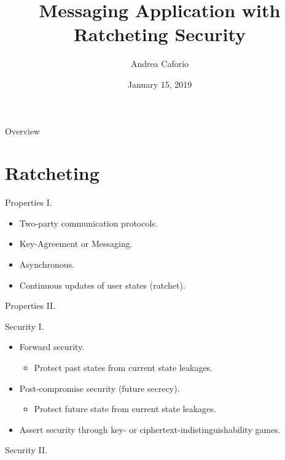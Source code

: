 \documentclass{beamer}
\title{Messaging Application with Ratcheting Security}
\date{January 15, 2019}
\author{Andrea Caforio}
\institute{Ecole Polytechnique Fédérale de Lausanne}
\begin{document}
\maketitle

\begin{frame}{Overview}
\tableofcontents
\end{frame}

\section{Ratcheting}
\label{sec:ratcheting}

\begin{frame}{Properties I.}
  \begin{itemize}
  \item Two-party communication protocols.
  \item Key-Agreement or Messaging.
  \item Asynchronous.
  \item Continuous updates of user states (ratchet).
  \end{itemize}
\end{frame}

\begin{frame}{Properties II.}
  \begin{figure}
    \centering
     
  \end{figure}
\end{frame}

\begin{frame}{Security I.}
  \begin{itemize}
  \item Forward security.
    \begin{itemize}
    \item Protect past states from current state leakages.
    \end{itemize}
  \item Post-compromise security (future secrecy).
    \begin{itemize}
    \item Protect future state from current state leakages.
    \end{itemize}
  \item Assert security through key- or ciphertext-indistinguishability games.
  \end{itemize}
\end{frame}

\begin{frame}{Security II.}
  \begin{figure}[ht]
      \centering
      \setlength{\fboxsep}{10pt}
      \scalebox{0.7}{%
      \fbox{%
        
      }
    }
  \end{figure}

  \begin{figure}[ht]
      \centering
      \setlength{\fboxsep}{10pt}
      \scalebox{0.7}{%
      \fbox{%
        
      }
    }
  \end{figure}
\end{frame}
\end{document}
